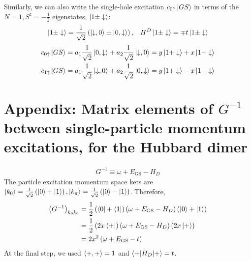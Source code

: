\documentclass{article}
\numberwithin{equation}{section}
\begin{document}
Similarly, we can also write the single-hole excitation $c_{0 \uparrow}\ket{GS}$ in terms of the $N=1, S^z = -\frac{1}{2}$ eigenstates, $\ket{1\pm \downarrow}$:
\begin{equation}\begin{aligned}
	\ket{1\pm \downarrow} = \frac{1}{\sqrt 2}\left(\ket{\downarrow, 0} \pm \ket{0, \downarrow}\right), && H^D \ket{1\pm \downarrow} = \mp t\ket{1\pm \downarrow}
\end{aligned}\end{equation}
\begin{equation}\begin{aligned}
	c_{0 \uparrow}\ket{GS} = a_1 \frac{1}{\sqrt 2}\ket{0, \downarrow} + a_2 \frac{1}{\sqrt 2}\ket{\downarrow, 0} = y\ket{1+ \downarrow} + x\ket{1- \downarrow}\\
	c_{1 \uparrow}\ket{GS} = a_1 \frac{1}{\sqrt 2}\ket{\downarrow, 0} + a_2 \frac{1}{\sqrt 2}\ket{0, \downarrow} = y\ket{1+ \downarrow} - x\ket{1- \downarrow}\\
\end{aligned}\end{equation}



\section{Appendix: Matrix elements of $G^{-1}$ between single-particle momentum excitations, for the Hubbard dimer}
\begin{equation}\begin{aligned}
	G^{-1} \equiv \omega + E_\text{GS} - H_D
\end{aligned}\end{equation}
The particle excitation momentum space kets are $\ket{k_0} = \frac{1}{\sqrt 2}\left(\ket{0} + \ket{1}\right) ,\ket{k_\pi} = \frac{1}{\sqrt 2}\left(\ket{0} - \ket{1}\right)$. Therefore,
\begin{equation}\begin{aligned}
	\left(G^{-1}\right)_{k_0 k_0} &= \frac{1}{2}\left(\bra{0} + \bra{1}\right)\left(\omega + E_\text{GS} - H_D\right)\left(\ket{0} + \ket{1}\right)\\
				      &= \frac{1}{2}\left(2x\bra{+}\right)\left(\omega + E_\text{GS} - H_D\right)\left(2x\ket{+}\right)\\
				      &= 2x^2\left(\omega + E_\text{GS} - t\right)\\
\end{aligned}\end{equation}
At the final step, we used $\braket{+,+} = 1$ and $\braket{+|H_D|+} = t$.


\end{document}
